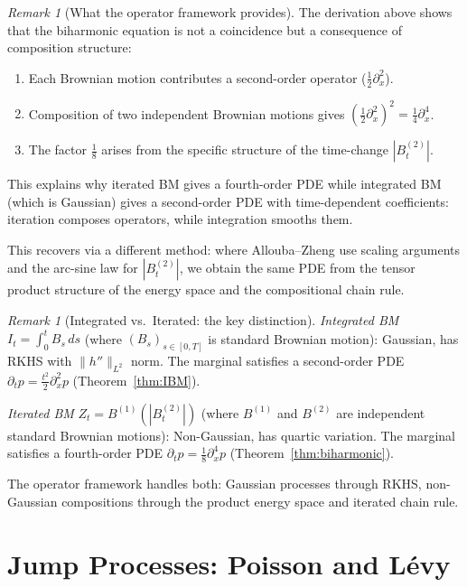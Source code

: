 \documentclass[12pt]{article}
\theoremstyle{plain}
\theoremstyle{definition}
\theoremstyle{remark}
\newtheorem{remark}[theorem]{Remark}
\begin{document}
\begin{remark}[What the operator framework provides]\label{rmk:operator-framework-IBM}
The derivation above shows that the biharmonic equation is not a coincidence but a consequence of composition structure:
\begin{enumerate}[label=(\arabic*)]
\item Each Brownian motion contributes a second-order operator ($\frac{1}{2}\partial_x^2$).
\item Composition of two independent Brownian motions gives $(\frac{1}{2}\partial_x^2)^2 = \frac{1}{4}\partial_x^4$.
\item The factor $\frac{1}{8}$ arises from the specific structure of the time-change $|B_t^{(2)}|$.
\end{enumerate}
This explains why iterated BM gives a fourth-order PDE while integrated BM (which is Gaussian) gives a second-order PDE with time-dependent coefficients: iteration composes operators, while integration smooths them.

This recovers \cite[Theorem 2.1]{AlloubaZheng2001} via a different method: where Allouba--Zheng use scaling arguments and the arc-sine law for $|B_t^{(2)}|$, we obtain the same PDE from the tensor product structure of the energy space and the compositional chain rule.
\end{remark}

\begin{remark}[Integrated vs.\ Iterated: the key distinction]\label{rmk:integrated-vs-iterated}
\emph{Integrated BM} $I_t = \int_0^t B_s \, ds$ (where $(B_s)_{s \in [0,T]}$ is standard Brownian motion): Gaussian, has RKHS with $\|h''\|_{L^2}$ norm. The marginal satisfies a second-order PDE $\partial_t p = \frac{t^2}{2}\partial_x^2 p$ (Theorem~\ref{thm:IBM}).

\emph{Iterated BM} $Z_t = B^{(1)}(|B_t^{(2)}|)$ (where $B^{(1)}$ and $B^{(2)}$ are independent standard Brownian motions): Non-Gaussian, has quartic variation. The marginal satisfies a fourth-order PDE $\partial_t p = \frac{1}{8}\partial_x^4 p$ (Theorem~\ref{thm:biharmonic}).

The operator framework handles both: Gaussian processes through RKHS, non-Gaussian compositions through the product energy space and iterated chain rule.
\end{remark}

\section{Jump Processes: Poisson and L\'{e}vy}\label{sec:jump}
\end{document}
